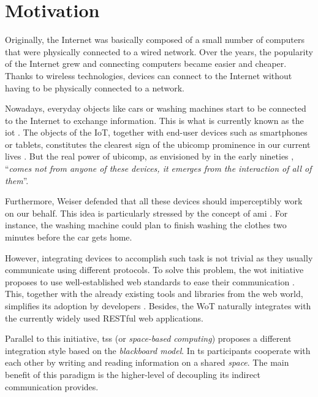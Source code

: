 \section{Motivation}
\label{sec:Motivation}

Originally, the Internet was basically composed of a small number of computers that were physically connected to a wired network.
Over the years, the popularity of the Internet grew and connecting computers became easier and cheaper.
Thanks to wireless technologies, devices can connect to the Internet without having to be physically connected to a network.

Nowadays, everyday objects like cars or washing machines start to be connected to the Internet to exchange information.
This is what is currently known as the \ac{iot} \citep{atzori_internet_2010}.
The objects of the IoT, together with end-user devices such as smartphones or tablets, constitutes the clearest sign of the \acf{ubicomp} prominence in our current lives \citep{caceres_ubicomp_2012}.
But the real power of \ac{ubicomp}, as envisioned by \citeauthor{weiser1991computer} in the early nineties \citep{weiser1991computer}, ``\emph{comes not from anyone of these devices, it emerges from the interaction of all of them}''.

Furthermore, Weiser defended that all these devices should imperceptibly work on our behalf.
This idea is particularly stressed by the concept of \ac{ami} \citep{ramos_ambient_2008}.
For instance, the washing machine could plan to finish washing the clothes two minutes before the car gets home.

\medskip

However, integrating devices to accomplish such task is not trivial as they usually communicate using different protocols.
To solve this problem, the \ac{wot} initiative proposes to use well-established web standards to ease their communication \citep{guinard_thesis_2011}.
This, together with the already existing tools and libraries from the web world, simplifies its adoption by developers \citep{guinard_search_2011}.
Besides, the WoT naturally integrates with the currently widely used RESTful web applications.

Parallel to this initiative, \aclp{ts} (or \emph{space-based computing}) \citep{gelernter_generative_1985} proposes a different integration style based on the \emph{blackboard model}.
In \ac{ts} participants cooperate with each other by writing and reading information on a shared \emph{space}.
The main benefit of this paradigm is the higher-level of decoupling its indirect communication provides. %

